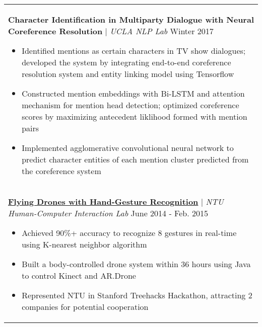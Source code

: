 \documentclass[letterpaper,11pt]{article} %
\begin{document}
{\begin{tabular}{p{18.5cm}}
{\bf{Character Identification in Multiparty Dialogue with Neural Coreference Resolution}} | {\it{UCLA NLP Lab}} \hfill Winter 2017
\begin{itemize}
\item Identified mentions as certain characters in TV show dialogues; developed the system by integrating end-to-end coreference resolution system and entity linking model using Tensorflow 
\item Constructed mention embeddings with Bi-LSTM and attention mechanism for mention head detection; optimized coreference scores by maximizing antecedent liklihood formed with mention pairs
\item Implemented agglomerative convolutional neural network to predict character entities of each mention cluster predicted from the coreference system \vspace*{-\baselineskip}
\end{itemize} \\
\vspace{.1mm}

\href{https://www.youtube.com/watch?v=jxsZaQ6PcXU}{\bf{Flying Drones with Hand-Gesture Recognition}} | {\it NTU Human-Computer Interaction Lab} \hfill  June 2014 - Feb. 2015
\begin{itemize}%
\item Achieved 90\%+ accuracy to recognize 8 gestures in real-time using K-nearest neighbor algorithm %
\item Built a body-controlled drone system within 36 hours using Java to control Kinect and AR.Drone
\item Represented NTU in Stanford Treehacks Hackathon, attracting 2 companies for potential cooperation \vspace*{-\baselineskip}
\end{itemize}\\


\end{tabular}}
\end{document}
